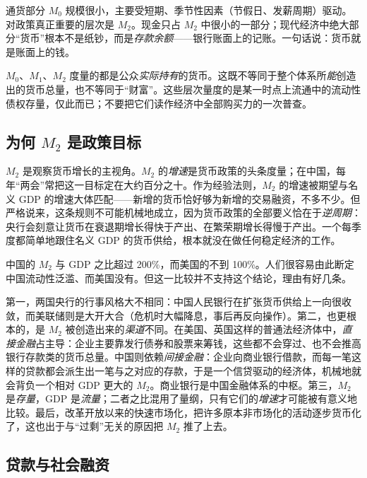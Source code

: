通货部分 $M_0$ 规模很小，主要受短期、季节性因素（节假日、发薪周期）驱动。对政策真正重要的层次是 $M_2$。现金只占 $M_2$ 中很小的一部分；现代经济中绝大部分“货币”根本不是纸钞，而是\emph{存款余额}——银行账面上的记账。一句话说：货币就是账面上的钱。

\begin{remark}[持有的货币与社会上的货币]
$M_0$、$M_1$、$M_2$ 度量的都是公众\emph{实际持有}的货币。这既不等同于整个体系所\emph{能}创造出的货币总量，也不等同于“财富”。这些层次量度的是某一时点上流通中的流动性债权存量，仅此而已；不要把它们读作经济中全部购买力的一次普查。
\end{remark}

\subsection{为何 \texorpdfstring{$M_2$}{M2} 是政策目标}

$M_2$ 是观察货币增长的主视角。$M_2$ 的\emph{增速}是货币政策的头条度量；在中国，每年“两会”常把这一目标定在大约百分之十。作为经验法则，$M_2$ 的增速被期望与名义 GDP 的增速大体匹配——新增的货币恰好够为新增的交易融资，不多不少。但严格说来，这条规则不可能机械地成立，因为货币政策的全部要义恰在于\emph{逆周期}：央行会刻意让货币在衰退期增长得快于产出、在繁荣期增长得慢于产出。一个每季度都简单地跟住名义 GDP 的货币供给，根本就没在做任何稳定经济的工作。

\begin{remark}
中国的 $M_2$ 与 GDP 之比超过 200\%，而美国的不到 100\%。人们很容易由此断定中国流动性泛滥、而美国没有。但这一比较并不支持这个结论，理由有好几条。

第一，两国央行的行事风格大不相同：中国人民银行在扩张货币供给上一向很收敛，而美联储则是大开大合（危机时大幅降息，事后再反向操作）。第二，也更根本的，是 $M_2$ 被创造出来的\emph{渠道}不同。在美国、英国这样的普通法经济体中，\emph{直接金融}占主导：企业主要靠发行债券和股票来筹钱，这些都不会穿过、也不会推高银行存款类的货币总量。中国则依赖\emph{间接金融}：企业向商业银行借款，而每一笔这样的贷款都会派生出一笔与之对应的存款，于是一个信贷驱动的经济体，机械地就会背负一个相对 GDP 更大的 $M_2$。商业银行是中国金融体系的中枢。第三，$M_2$ 是\emph{存量}，GDP 是\emph{流量}；二者之比混用了量纲，只有它们的\emph{增速}才可能被有意义地比较。最后，改革开放以来的快速市场化，把许多原本非市场化的活动逐步货币化了，这也出于与“过剩”无关的原因把 $M_2$ 推了上去。
\end{remark}

\subsection{贷款与社会融资}

